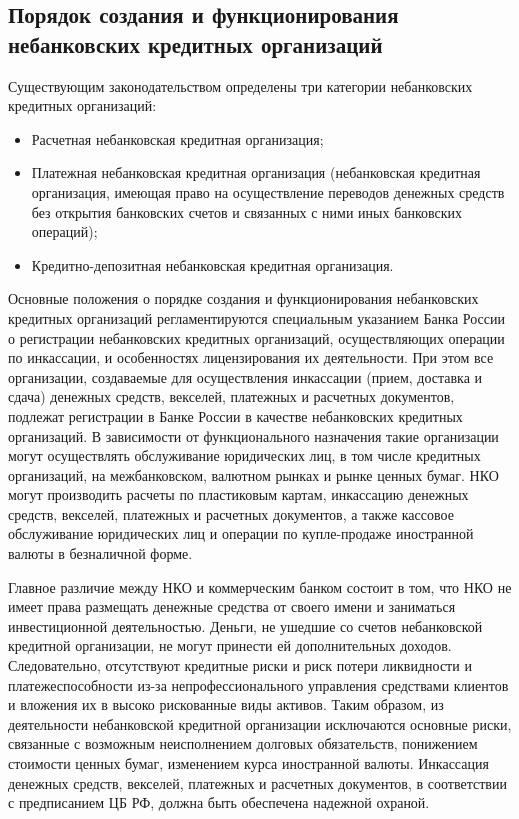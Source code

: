 \documentclass[a4paper,12pt,fleqn]{article} %
\begin{document}
\subsection{Порядок создания и функционирования небанковских кредитных организаций}

Существующим законодательством определены три категории небанковских кредитных организаций: 

\begin{itemize}
	\item Расчетная небанковская кредитная организация;
	\item Платежная небанковская кредитная организация (небанковская кредитная организация, имеющая право на осуществление переводов денежных средств без открытия банковских счетов и связанных с ними иных банковских операций);
	\item Кредитно-депозитная небанковская кредитная организация.
\end{itemize}

Основные положения о порядке создания и функционирования небанковских кредитных организаций регламентируются специальным указанием Банка России о регистрации небанковских кредитных организаций, осуществляющих операции по инкассации, и особенностях лицензирования их деятельности. При этом все   организации,   создаваемые  для  осуществления инкассации (прием,  доставка  и  сдача)  денежных средств,  векселей, платежных и расчетных документов,  подлежат регистрации в Банке России в качестве небанковских кредитных организаций. В зависимости от функционального назначения такие организации могут осуществлять обслуживание юридических лиц, в том числе кредитных организаций, на межбанковском, валютном рынках и рынке ценных бумаг. НКО могут производить расчеты по пластиковым картам, инкассацию денежных средств, векселей, платежных и расчетных документов, а также кассовое обслуживание юридических лиц и операции по купле-продаже иностранной валюты в безналичной форме. 

Главное различие между НКО и коммерческим банком состоит в том, что НКО не имеет права размещать денежные средства от своего имени и заниматься инвестиционной деятельностью. Деньги, не ушедшие со счетов небанковской кредитной организации, не могут принести ей дополнительных доходов. Следовательно, отсутствуют кредитные риски и риск потери ликвидности и платежеспособности из-за непрофессионального управления средствами клиентов и вложения их в высоко рискованные виды активов. Таким образом, из деятельности небанковской кредитной организации исключаются основные риски, связанные с возможным неисполнением долговых обязательств, понижением стоимости ценных бумаг, изменением курса иностранной валюты. Инкассация денежных средств,  векселей,  платежных и расчетных документов, в соответствии с предписанием ЦБ РФ, должна  быть  обеспечена  надежной  охраной.  
\end{document}
